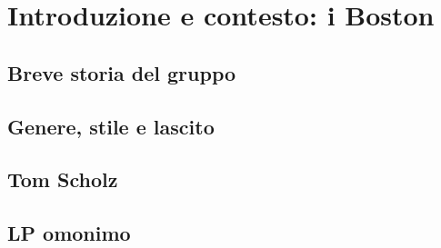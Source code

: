 \documentclass[class=book, crop=false, oneside, 12pt]{standalone}
\begin{document}
\chapter{Introduzione e contesto: i Boston}

\section{Breve storia del gruppo}
\section{Genere, stile e lascito}
\section{Tom Scholz}
\section{LP omonimo}
\end{document}
